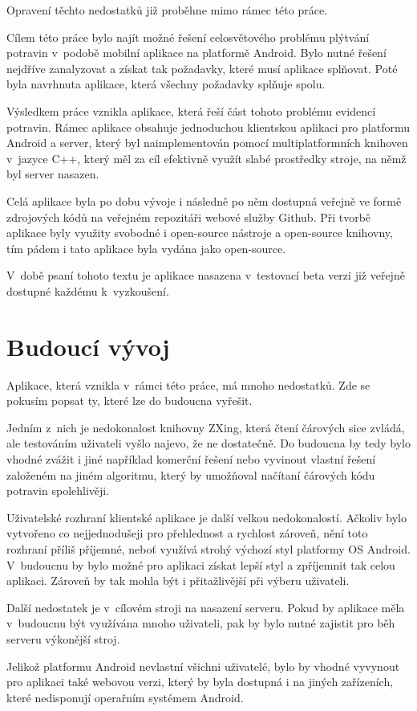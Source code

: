 \documentclass[thesis=B,czech]{FITthesis}[2013/10/20]
\begin{document}
Opravení těchto nedostatků již proběhne mimo rámec této práce.

\begin{conclusion}
Cílem této práce bylo najít možné řešení celosvětového problému plýtvání potravin v~podobě mobilní aplikace na platformě Android. Bylo nutné řešení nejdříve zanalyzovat a získat tak požadavky, které musí aplikace splňovat. Poté byla navrhnuta aplikace, která všechny požadavky splňuje spolu.
	
Výsledkem práce vznikla aplikace, která řeší část tohoto problému evidencí potravin. Rámec aplikace obsahuje jednoduchou klientskou aplikaci pro platformu Android a server, který byl naimplementován pomocí multiplatformních knihoven v~jazyce C++, který měl za cíl efektivně využít slabé prostředky stroje, na němž byl server nasazen.

Celá aplikace byla po dobu vývoje i následně po něm dostupná veřejně ve formě zdrojových kódů na veřejném repozitáři webové služby Github. Při tvorbě aplikace byly využity svobodné i open-source nástroje a open-source knihovny, tím pádem i tato aplikace byla vydána jako open-source.

V~době psaní tohoto textu je aplikace nasazena v~testovací beta verzi již veřejně dostupné každému k~vyzkoušení.

\section{Budoucí vývoj}

Aplikace, která vznikla v~rámci této práce, má mnoho nedostatků. Zde se pokusím popsat ty, které lze do budoucna vyřešit.

Jedním z~nich je nedokonalost knihovny ZXing, která čtení čárových sice zvládá, ale testováním uživateli vyšlo najevo, že ne dostatečně. Do budoucna by tedy bylo vhodné zvážit i jiné například komerční řešení nebo vyvinout vlastní řešení založeném na jiném algoritmu, který by umožňoval načítaní čárových kódu potravin spolehlivěji.

Uživatelské rozhraní klientské aplikace je další velkou nedokonalostí. Ačkoliv bylo vytvořeno co nejjednodušeji pro přehlednost a rychlost zároveň, nění toto rozhraní příliš příjemné, neboť využívá strohý výchozí styl platformy OS Android. V~budoucnu by bylo možné pro aplikaci získat lepší styl a zpříjemnit tak celou aplikaci. Zároveň by tak mohla být i přitažlivější při výberu uživateli.

Další nedostatek je v~cílovém stroji na nasazení serveru. Pokud by aplikace měla v~budoucnu být využívána mnoho uživateli, pak by bylo nutné zajistit pro běh serveru výkonější stroj.

Jelikož platformu Android nevlastní všichni uživatelé, bylo by vhodné vyvynout pro aplikaci také webovou verzi, který by byla dostupná i na jiných zařízeních, které nedisponují operařním systémem Android.

\end{conclusion}
\end{document}
